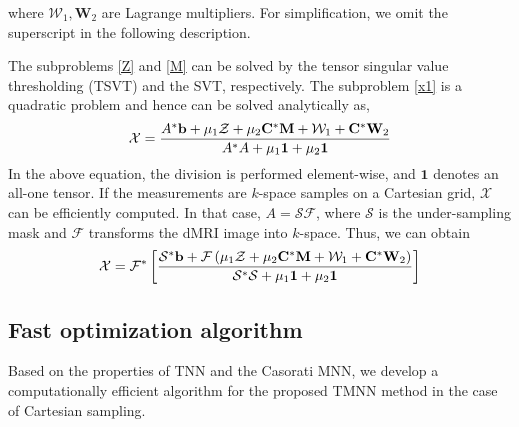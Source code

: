 \documentclass{article}
\begin{document}
\noindent where $\mathcal{W}_1, \mathbf{W}_2$ are Lagrange multipliers. For simplification, we omit the superscript in the following description.

The subproblems \eqref{Z} and \eqref{M} can be solved by the tensor singular value thresholding (TSVT) \cite{ref_tnn1} and the SVT, respectively. The subproblem \eqref{x1} is a quadratic problem and hence can be solved analytically as, 
\begin{equation}
  \footnotesize
    \mathcal{X} =\frac{A^* \mathbf b+\mu_1\mathcal{Z}+\mu_2 \mathbf C^* \mathbf M+\mathcal{W}_1+\mathbf C^* \mathbf{W}_2}
    {A^*A+\mu_1 \mathbf 1+\mu_2\mathbf 1}
\end{equation}
In the above equation, the division is performed element-wise, and $\mathbf 1$ denotes an all-one tensor.
If the measurements are $k$-space samples on a Cartesian grid, $\mathcal{X}$ can be efficiently computed. In that case, $A=\mathcal{S}\mathcal{F}$, where $\mathcal{S}$ is the under-sampling mask and $\mathcal{F}$ transforms the dMRI image into $k$-space. Thus, we can obtain
\begin{equation}
  \footnotesize
  \label{x2}
  \mathcal{X} = \mathcal{F}^* \left[\frac{\mathcal{S}^*\mathbf b+\mathcal{F} \left(\mu_1\mathcal{Z}+\mu_2 \mathbf C^* \mathbf M+\mathcal{W}_1+\mathbf C^* \mathbf{W}_2\right)}{\mathcal{S}^* \mathcal{S}+\mu_1\mathbf 1+\mu_2\mathbf 1}\right]
\end{equation}


\subsection{Fast optimization algorithm}
\label{fast alg}

Based on the properties of TNN and the Casorati MNN, we develop a computationally efficient algorithm for the proposed TMNN method in the case of Cartesian sampling. 
\end{document}
